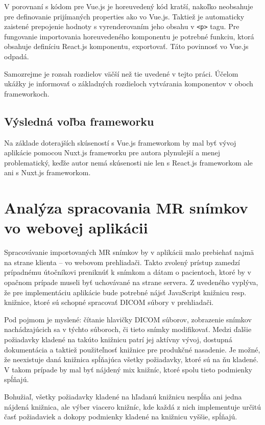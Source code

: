 V porovnaní s kódom pre Vue.js je horeuvedený kód kratší, nakoľko neobsahuje  pre definovanie prijímaných properties ako vo Vue.js. Taktiež je automaticky zaistené prepojenie hodnoty  s vyrenderovaním jeho obsahu v \texttt{<p>} tagu. Pre fungovanie importovania horeuvedeného komponentu je potrebné funkciu, ktorá obsahuje definíciu React.js komponentu, exportovať. Táto povinnosť vo Vue.js odpadá.

Samozrejme je rozsah rozdielov väčší než tie uvedené v tejto práci. Účelom ukážky je informovať o základných rozdieloch vytvárania komponentov v oboch frameworkoch.

\subsection {Výsledná voľba frameworku}
Na základe doterajších skúseností s Vue.js frameworkom by mal byť vývoj aplikácie pomocou Nuxt.js frameworku pre autora plynulejší a menej problematický, keďže autor nemá skúsenosti nie len s React.js frameworkom ale ani s Nuxt.js frameworkom.

\section {Analýza spracovania MR snímkov vo webovej aplikácii}
Spracovávanie importovaných MR snímkov by v aplikácii malo prebiehať najmä na strane klienta -- vo webovom prehliadači. Takto zvolený prístup zamedzí prípadnému útočníkovi preniknúť k snímkom a dátam o pacientoch, ktoré by v opačnom prípade museli byť uchovávané na strane servera. Z uvedeného vyplýva, že pre implementáciu aplikácie bude potrebné nájsť JavaScript knižnicu resp. knižnice, ktoré sú schopné spracovať DICOM súbory v prehliadači.

Pod pojmom  je myslené: čítanie hlavičky DICOM súborov, zobrazenie snímkov nachádzajúcich sa v týchto súboroch, či tieto snímky modifikovať. Medzi ďalšie požiadavky kladené na takúto knižnicu patrí jej aktívny vývoj, dostupná dokumentácia a taktiež použiteľnosť knižnice pre produkčné nasadenie. Je možné, že neexistuje daná knižnica spĺňajúca všetky požiadavky, ktoré sú na ňu kladené. V takom prípade by mal byť nájdený mix knižníc, ktoré spolu tieto podmienky spĺňajú.

Bohužiaľ, všetky požiadavky kladené na hľadanú knižnicu nespĺňa ani jedna nájdená knižnica, ale výber viacero knižníc, kde každá z nich implementuje určitú časť požiadaviek a dokopy podmienky kladené na knižnicu vyššie, spĺňajú. \clearpage

